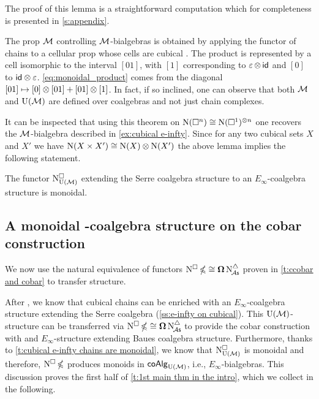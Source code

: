 The proof of this lemma is a straightforward computation which for completeness is presented in \cref{s:appendix}.

\begin{remark}
	The prop $\mathcal{M}$ controlling $\mathcal{M}$-bialgebras is obtained by applying the functor of chains to a cellular prop whose cells are cubical \cite{medina2021prop2}.
	The product is represented by a cell isomorphic to the interval $[01]$, with $[1]$ corresponding to $\operatorname{\varepsilon} \otimes \, \mathsf{id}$ and $[0]$ to $\mathsf{id} \otimes \operatorname{\varepsilon}$.
	\cref{eq:monoidal_product} comes from the diagonal $[01] \mapsto [0] \otimes [01] + [01] \otimes [1]$.
	In fact, if so inclined, one can observe that both $\mathcal{M}$ and ${\operatorname{U}(\mathcal{M})}$ are defined over coalgebras and not just chain complexes.
\end{remark}


It can be inspected that using this theorem on $\operatorname{N}(\square^n) \cong \operatorname{N}(\square^1)^{\otimes n}$ one recovers the $\mathcal{M}$-bialgebra described in \cref{ex:cubical e-infty}.
Since for any two cubical sets $X$ and $X'$ we have $\operatorname{N}(X \times X') \cong \operatorname{N}(X) \otimes \operatorname{N}(X')$ the above lemma implies the following statement.

\begin{theorem}\label{t:cubical e-infty chains are monoidal}
	The functor $\operatorname{N^{\square}_{{\operatorname{U}(\mathcal{M})}}}$ extending the Serre coalgebra structure to an $E_\infty$-coalgebra structure is monoidal.
\end{theorem}

\subsection{A monoidal \pdfEinfty-coalgebra structure on the cobar construction}\label{ss:e-infty on cobar}


We now use the natural equivalence of functors $\operatorname{N^{\square}} \operatorname{\mathbb{\Omega}} \cong \operatorname{\mathbf{\Omega}} \operatorname{N^{\triangle}_{\!{\mathcal{A}\mathsf{s}}}}$ proven in \cref{t:ccobar and cobar} to transfer structure.

After \cite{medina2022cube_einfty}, we know that cubical chains can be enriched with an $E_\infty$-coalgebra structure extending the Serre coalgebra (\cref{ss:e-infty on cubical}).
This ${\operatorname{U}(\mathcal{M})}$-structure can be transferred via $\operatorname{N^{\square}} \operatorname{\mathbb{\Omega}} \cong \operatorname{\mathbf{\Omega}} \operatorname{N^{\triangle}_{\!{\mathcal{A}\mathsf{s}}}}$ to provide the cobar construction with and $E_\infty$-structure extending Baues coalgebra structure.
Furthermore, thanks to \cref{t:cubical e-infty chains are monoidal}, we know that $\operatorname{N^{\square}_{{\operatorname{U}(\mathcal{M})}}}$ is monoidal and therefore, $\operatorname{N^{\square}} \operatorname{\mathbb{\Omega}}$ produces monoids in $\mathsf{coAlg}_{{\operatorname{U}(\mathcal{M})}}$, i.e., $E_\infty$-bialgebras.
This discussion proves the first half of \cref{t:1st main thm in the intro}, which we collect in the following.


